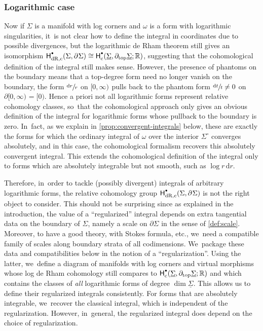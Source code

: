 \documentclass[JEP,XML,SOM,Unicode,NoFloatCountersInSection,published]{cedram}
\let\oldbullet\bullet
\renewcommand{\bullet}{{\raisebox{1pt}{$\scriptscriptstyle\oldbullet$}}}
\newcommand{\dslog}[1]{\sfrac{\dd#1}{#1}}
\theoremstyle{definition}
\theoremstyle{remark}
\newcommand{\RR}{\mathbb{R}}
\newcommand{\halfspc}[1]{[0,\infty)^{#1}}
\newcommand{\dd}{\mathrm{d}}
\newcommand{\Sig}{\Sigma}
\newcommand{\uSig}{\underline{\Sigma}}
\newcommand{\bdSig}[1][]{\partial^{#1}\Sigma}
\newcommand{\intSig}{\Sigma^\circ}
\newcommand{\HdRc}[2][\bullet]{\mathsf{H}_{\mathrm{dR},\mathrm{c}}^{#1}(#2)}
\begin{document}
\subsubsection{Logarithmic case}
Now if $\Sig$ is a manifold with log corners and $\omega$ is a form with logarithmic singularities, it~is not clear how to define the integral in coordinates due to possible divergences, but the logarithmic de Rham theorem still gives an isomorphism $\HdRc{\Sig,\bdSig} \cong \mathsf{H}^\bullet_{\mathrm{c}}(\uSig,\partial_{\mathrm{top}}\uSig;\RR)$, suggesting that the cohomological definition of the integral still makes sense. However, the presence of phantoms on the boundary means that a top-degree form need no longer vanish on the boundary, \eg the form $\dslog{r}$ on $\halfspc{}$ pulls back to the phantom form $\dslog{t}\neq 0$ on $\partial\halfspc{} = [0)$. Hence a priori not all logarithmic forms represent relative cohomology classes, so~that the cohomological approach only gives an obvious definition of the integral for logarithmic forms whose pullback to the boundary is zero. In~fact, as we explain in \autoref{prop:convergent-integrals} below, these are exactly the forms for which the ordinary integral of $\omega$ over the interior $\intSig$ converges absolutely, and in this case, the cohomological formalism recovers this absolutely convergent integral. This extends the cohomological definition of the integral only to forms which are absolutely integrable but not smooth, such as $\log r\, \dd r$.

Therefore, in~order to tackle (possibly divergent) integrals of arbitrary logarithmic forms, the relative cohomology group $\HdRc{\Sig,\bdSig}$ is not the right object to consider. This should not be surprising since as explained in the introduction, the value of a ``regularized'' integral depends on extra tangential data on the boundary of $\Sig$, namely a scale on $\partial\Sigma$ in the sense of \autoref{def:scale}.
Moreover, to have a good theory, with Stokes formula, etc., we~need a compatible family of scales along boundary strata of all codimensions. We~package these data and compatibilities below in the notion of a ``regularization''. Using the latter, we~define a diagram of manifolds with log corners and virtual morphisms whose log de Rham cohomology still compares to $\mathsf{H}^\bullet_{\mathrm{c}}(\uSig,\partial_{\mathrm{top}}\uSig;\RR)$ and which contains the classes of \emph{all} logarithmic forms of degree $\dim \uSig$. This allows us to define their regularized integrals consistently. For forms that are absolutely integrable, we~recover the classical integral, which is independent of the regularization. However, in~general, the regularized integral does depend on the choice of regularization.
\end{document}
